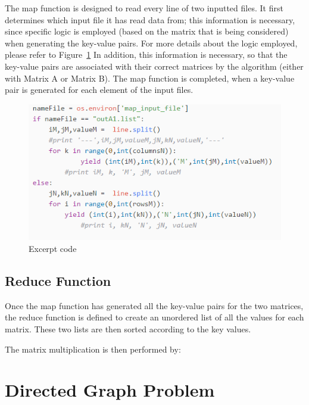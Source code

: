 \documentclass[journal, a4paper]{IEEEtran}
\begin{document}
The map function is designed to read every line of two inputted files. It first determines which input file it has read data from; this information is necessary, since specific logic is employed (based on the matrix that is being considered) when generating the key-value pairs. For more details about the logic employed, please refer to Figure~\ref{code} In addition, this information is necessary, so that the key-value pairs are associated with their correct matrices by the algorithm (either with Matrix A or Matrix B). The map function is completed, when a key-value pair is generated for each element of the input files. 

	\begin{figure}[hbtp!]
		\centering
		\includegraphics[scale = 1]{code.png}
		\caption{Excerpt code}
		\label {code}
	\end{figure}


\subsection{Reduce Function}
\noindent
Once the map function has generated all the key-value pairs for the two matrices, the reduce function is defined to create an unordered list of all the values for each matrix. These two lists are then sorted according to the key values. 

The matrix multiplication is then performed by: 

\section{Directed Graph Problem}
\end{document}
